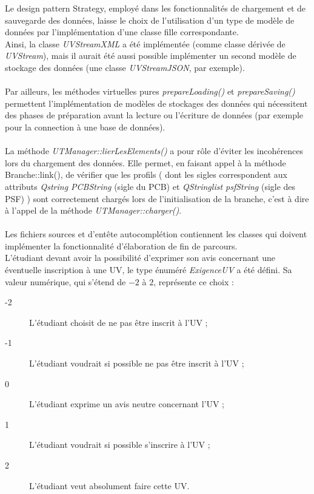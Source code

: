 \documentclass[a4paper,10pt,french]{report}
\begin{document}
	
	Le design pattern Strategy, employé dans les fonctionnalités de chargement et de sauvegarde des données, laisse le choix de l'utilisation d'un type de modèle de données par l'implémentation d'une classe fille correspondante.\\
	Ainsi, la classe \emph{UVStreamXML} a été implémentée (comme classe dérivée de \emph{UVStream}), mais il aurait été aussi possible implémenter un second modèle de stockage des données (une classe \emph{UVStreamJSON}, par exemple).\\\\
	Par ailleurs, les méthodes virtuelles pures \emph{prepareLoading()} et \emph{prepareSaving()} permettent l'implémentation de modèles de stockages des données qui nécessitent des phases de préparation avant la lecture ou l'écriture de données (par exemple pour la connection à une base de données).\\\\
	
	La méthode \emph{UTManager::lierLesElements()} a pour rôle d'éviter les incohérences lors du chargement des données.
	Elle permet, en faisant appel à la méthode Branche::link(), de vérifier que les profils ( dont les sigles correspondent aux attributs \emph{Qstring PCBString} (sigle du PCB) et \emph{QStringlist psfString} (sigle des PSF) ) sont correctement chargés lors de l'initialisation de la branche, c'est à dire à l'appel de la méthode \emph{UTManager::charger()}.\\\\
	
	
	Les fichiers sources et d'entête autocomplétion contiennent les classes qui doivent implémenter la fonctionnalité d'élaboration de fin  de parcours.\\
	L'étudiant devant avoir la possibilité d'exprimer son avis concernant une éventuelle inscription à une UV, le type énuméré \emph{ExigenceUV} a été défini. Sa valeur numérique, qui s'étend de $-2$ à $2$, représente ce choix : \\
	\begin{description}
	\item[-2] L'étudiant choisit de ne pas être inscrit à l'UV ;
	\item[-1] L'étudiant voudrait si possible ne pas être inscrit à l'UV ;	
	\item[0] L'étudiant exprime un avis neutre concernant l'UV ;
	\item[1] L'étudiant voudrait si possible s'inscrire à l'UV ;
	\item[2] L'étudiant veut absolument faire cette UV.
	\end{description}
	
\end{document}
